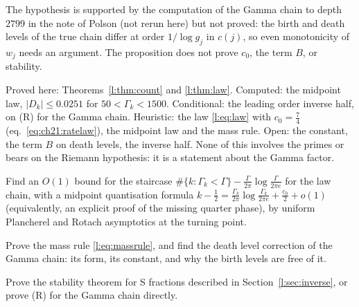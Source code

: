 The hypothesis is supported by the computation of the Gamma chain to depth $2799$ in the note of Polson (not rerun here) but not proved: the birth and death levels of the true chain differ at order $1/\log g_j$ in $c(j)$, so even monotonicity of $w_j$ needs an argument. The proposition does not prove $c_0$, the term $B$, or stability.

\begin{remark}[Status]
Proved here: Theorems~\ref{l:thm:count} and \ref{l:thm:law}. Computed: the midpoint law, $|D_k|\le0.0251$ for $50<\Gamma_k<1500$. Conditional: the leading order inverse half, on (R) for the Gamma chain. Heuristic: the law \eqref{l:eq:law} with $c_0=\frac74$ (eq.~\eqref{eq:ch21:ratelaw}), the midpoint law and the mass rule. Open: the constant, the term $B$ on death levels, the inverse half. None of this involves the primes or bears on the Riemann hypothesis: it is a statement about the Gamma factor.
\end{remark}

\begin{problem}
Find an $O(1)$ bound for the staircase $\#\{k:\Gamma_k<\Gamma\}-\frac\Gamma{2\pi}\log\frac\Gamma{2\pi e}$ for the law chain, with a midpoint quantisation formula $k-\frac12=\frac{\Gamma_k}{2\pi}\log\frac{\Gamma_k}{2\pi e}+\frac{c_0}2+o(1)$ (equivalently, an explicit proof of the missing quarter phase), by uniform Plancherel and Rotach asymptotics at the turning point.
\end{problem}

\begin{problem}
Prove the mass rule \eqref{l:eq:massrule}, and find the death level correction of the Gamma chain: its form, its constant, and why the birth levels are free of it.
\end{problem}

\begin{problem}
Prove the stability theorem for S fractions described in Section~\ref{l:sec:inverse}, or prove (R) for the Gamma chain directly.
\end{problem}
